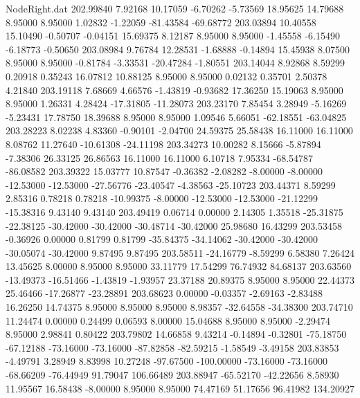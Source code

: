 \begin{filecontents}{NodeRight.dat}
 202.99840    7.92168   10.17059    -6.70262   -5.73569   18.95625   14.79688    8.95000    8.95000    1.02832   -1.22059  -81.43584  -69.68772
 203.03894   10.40558   15.10490    -0.50707   -0.04151   15.69375    8.12187    8.95000    8.95000   -1.45558   -6.15490   -6.18773   -0.50650
 203.08984    9.76784   12.28531    -1.68888   -0.14894   15.45938    8.07500    8.95000    8.95000   -0.81784   -3.33531  -20.47284   -1.80551
 203.14044    8.92868    8.59299     0.20918    0.35243   16.07812   10.88125    8.95000    8.95000    0.02132    0.35701    2.50378    4.21840
 203.19118    7.68669    4.66576    -1.43819   -0.93682   17.36250   15.19063    8.95000    8.95000    1.26331    4.28424  -17.31805  -11.28073
 203.23170    7.85454    3.28949    -5.16269   -5.23431   17.78750   18.39688    8.95000    8.95000    1.09546    5.66051  -62.18551  -63.04825
 203.28223    8.02238    4.83360    -0.90101   -2.04700   24.59375   25.58438   16.11000   16.11000    8.08762   11.27640  -10.61308  -24.11198
 203.34273   10.00282    8.15666    -5.87894   -7.38306   26.33125   26.86563   16.11000   16.11000    6.10718    7.95334  -68.54787  -86.08582
 203.39322   15.03777   10.87547    -0.36382   -2.08282   -8.00000   -8.00000  -12.53000  -12.53000  -27.56776  -23.40547   -4.38563  -25.10723
 203.44371    8.59299    2.85316     0.78218    0.78218  -10.99375   -8.00000  -12.53000  -12.53000  -21.12299  -15.38316    9.43140    9.43140
 203.49419    0.06714    0.00000     2.14305    1.35518  -25.31875  -22.38125  -30.42000  -30.42000  -30.48714  -30.42000   25.98680   16.43299
 203.53458   -0.36926    0.00000     0.81799    0.81799  -35.84375  -34.14062  -30.42000  -30.42000  -30.05074  -30.42000    9.87495    9.87495
 203.58511  -24.16779   -8.59299     6.58380    7.26424   13.45625    8.00000    8.95000    8.95000   33.11779   17.54299   76.74932   84.68137
 203.63560  -13.49373  -16.51466    -1.43819   -1.93957   23.37188   20.89375    8.95000    8.95000   22.44373   25.46466  -17.26877  -23.28891
 203.68623    0.00000   -0.03357    -2.69163   -2.83488   16.26250   14.74375    8.95000    8.95000    8.95000    8.98357  -32.64558  -34.38300
 203.74710   11.24474    0.00000     0.24499    0.06593    8.00000   15.04688    8.95000    8.95000   -2.29474    8.95000    2.98841    0.80422
 203.79802   14.66858    9.43214    -0.14894   -0.32801  -75.18750  -67.12188  -73.16000  -73.16000  -87.82858  -82.59215   -1.58549   -3.49158
 203.83853   -4.49791    3.28949     8.83998   10.27248  -97.67500 -100.00000  -73.16000  -73.16000  -68.66209  -76.44949   91.79047  106.66489
 203.88947  -65.52170  -42.22656     8.58930   11.95567   16.58438   -8.00000    8.95000    8.95000   74.47169   51.17656   96.41982  134.20927

\end{filecontents}

